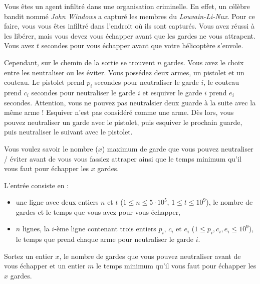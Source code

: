 \problemname{\problemyamlname}


Vous êtes un agent infiltré dans une organisation criminelle. En effet, un célèbre bandit nommé \textit{John Windows} a capturé les membres du \textit{Louvain-Li-Nux}. Pour ce faire, vous vous êtes infiltré dans l'endroit où ils sont capturés. Vous avez réussi à les libérer, mais vous devez vous échapper avant que les gardes ne vous attrapent.  Vous avez $t$ secondes pour vous échapper avant que votre hélicoptère s'envole.

Cependant, sur le chemin de la sortie se trouvent $n$ gardes. Vous avez le choix entre les neutraliser ou les éviter. Vous possédez deux armes, un pistolet et un couteau. Le pistolet prend $p_i$ secondes pour neutraliser le garde $i$, le couteau prend $c_i$ secondes pour neutraliser le garde $i$ et esquiver le garde $i$ prend $e_i$ secondes. Attention, vous ne pouvez pas neutralsier deux guarde à la suite avec la même arme ! Esquiver n'est pas considéré comme une arme. Dès lors, vous pouvez neutraliser un garde avec le pistolet, puis esquiver le prochain guarde, puis neutraliser le suivant avec le pistolet. 

Vous voulez savoir le nombre ($x$) maximum de garde que vous pouvez neutraliser / éviter avant de vous vous fassiez attraper ainsi que le temps minimum qu'il vous faut pour échapper les $x$ gardes.
\begin{Input}
    L'entrée consiste en :
    \begin{itemize}
        \item une ligne avec deux entiers $n$ et $t$ ($1\leq n \leq 5 \cdot 10^5$, $1\leq t \leq 10^9$), le nombre de gardes et le temps que vous avez pour vous échapper,
        \item $n$ lignes, la $i$-ème ligne contenant trois entiers  $p_i$, $c_i$ et $e_i$ ($1\leq p_i, c_i, e_i \leq 10^9$), le temps que prend chaque arme pour neutraliser le garde $i$.
    \end{itemize}
\end{Input}

\begin{Output}
    Sortez un entier $x$, le nombre de gardes que vous pouvez neutraliser avant de vous échapper et un entier $m$ le temps minimum qu'il vous faut pour échapper les $x$ gardes.
\end{Output}
